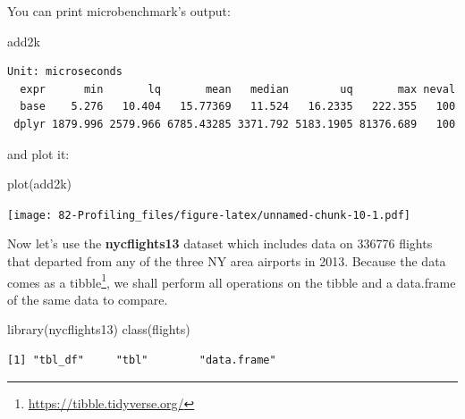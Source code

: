 \documentclass[
]{book}
\newenvironment{Shaded}{\begin{snugshade}}{\end{snugshade}}
\newcommand{\AttributeTok}[1]{\textcolor[rgb]{0.77,0.63,0.00}{#1}}
\newcommand{\FunctionTok}[1]{\textcolor[rgb]{0.00,0.00,0.00}{#1}}
\newcommand{\NormalTok}[1]{#1}
\newcommand{\OtherTok}[1]{\textcolor[rgb]{0.56,0.35,0.01}{#1}}
\newcommand{\SpecialCharTok}[1]{\textcolor[rgb]{0.00,0.00,0.00}{#1}}
\DeclareRobustCommand{\href}[2]{#2\footnote{\url{#1}}}
\renewcommand{\href}[2]{#2\footnote{\url{#1}}}
\begin{document}
\begin{Shaded}
\end{Shaded}

You can print microbenchmark's output:

\begin{Shaded}
\begin{Highlighting}[]
\NormalTok{add2k}
\end{Highlighting}
\end{Shaded}

\begin{verbatim}
Unit: microseconds
  expr      min       lq       mean   median        uq       max neval
  base    5.276   10.404   15.77369   11.524   16.2335   222.355   100
 dplyr 1879.996 2579.966 6785.43285 3371.792 5183.1905 81376.689   100
\end{verbatim}

and plot it:

\begin{Shaded}
\begin{Highlighting}[]
\FunctionTok{plot}\NormalTok{(add2k)}
\end{Highlighting}
\end{Shaded}

\texttt{[image: 82-Profiling\_files/figure-latex/unnamed-chunk-10-1.pdf]}

Now let's use the \textbf{nycflights13} dataset which includes data on 336776 flights that departed from any of the three NY area airports in 2013. Because the data comes as a \href{https://tibble.tidyverse.org/}{tibble}, we shall perform all operations on the tibble and a data.frame of the same data to compare.

\begin{Shaded}
\begin{Highlighting}[]
\FunctionTok{library}\NormalTok{(nycflights13)}
\FunctionTok{class}\NormalTok{(flights)}
\end{Highlighting}
\end{Shaded}

\begin{verbatim}
[1] "tbl_df"     "tbl"        "data.frame"
\end{verbatim}
\end{document}
